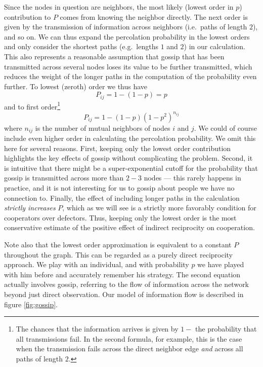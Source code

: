 \documentclass{article}
\renewcommand{\=}[1]{\stackrel{#1}{=}} %
\begin{document}
Since the nodes in question are neighbors, the most likely (lowest order in $p$) contribution to $P$ comes from knowing the neighbor directly. The next order is given by the transmission of information across neighbors (i.e.~paths of length $2$), and so on. We can thus expand the percolation probability in the lowest orders and only consider the
shortest paths (e.g.~lengths $1$ and $2$) in our calculation. This also
represents a reasonable assumption that gossip that has been transmitted
across several nodes loses its value to be further transmitted, which
reduces the weight of the longer paths in the computation of the
probability even further. To lowest (zeroth) order we thus have
\begin{equation}\label{eq:zeroth_order_gossip}
P_{ij} = 1 - (1-p) = p
\end{equation}
 and to first order\footnote{The chances that the information arrives is given by
$1 - $ the probability that all transmissions fail. In the second
formula, for example, this is the case when the transmission fails
across the direct neighbor edge \emph{and} across all paths of length
$2$.}
\begin{equation}\label{eq:first_order_gossip}
P_{ij} = 1 - (1-p)(1-p^2)^{n_{ij}}
\end{equation}
where $n_{ij}$ is the number of mutual neighbors of nodes $i$ and $j$. We could of course include even higher order in calculating the percolation probability. We omit this here for several reasons. First, keeping only the lowest order contribution highlights the key effects of gossip without complicating the problem. Second, it is intuitive that there might be a super-exponential cutoff for the probability that gossip is transmitted across more than $2-3$ nodes --- this rarely happens in practice, and it is not interesting for us to gossip about people we have no connection to. Finally, the effect of including longer paths in the calculation \emph{strictly increases} $P$, which as we will see is a strictly more favorably condition for cooperators over defectors. Thus, keeping only the lowest order is the most conservative estimate of the positive effect of indirect reciprocity on cooperation.

 Note also that the lowest order approximation is equivalent to a
constant $P$ throughout the graph. This can be regarded as a purely direct reciprocity approach.
We play with an individual, and with probability $p$ we have played with
him before and accurately remember his strategy. The second equation
actually involves gossip, referring to the flow of information across
the network beyond just direct observation. Our model of information flow is described in figure \ref{fig:gossip}.
\end{document}
